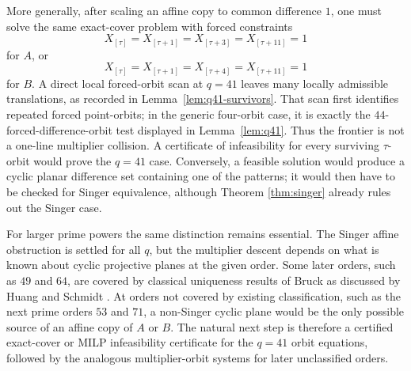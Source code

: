 \documentclass[11pt,letterpaper]{amsart}
\theoremstyle{plain}
\begin{document}
More generally, after scaling an affine copy to common difference \(1\),
one must solve the same exact-cover problem with forced constraints
\[
 X_{[\tau]}=X_{[\tau+1]}=X_{[\tau+3]}=X_{[\tau+11]}=1
\]
for \(A\), or
\[
 X_{[\tau]}=X_{[\tau+1]}=X_{[\tau+4]}=X_{[\tau+11]}=1
\]
for \(B\).  A direct local forced-orbit scan at \(q=41\) leaves many
locally admissible translations, as recorded in
Lemma~\ref{lem:q41-survivors}.
That scan first identifies repeated forced point-orbits; in the generic
four-orbit case, it is exactly the \(44\)-forced-difference-orbit test
displayed in Lemma~\ref{lem:q41}.
Thus the frontier is not a one-line multiplier collision.  A certificate
of infeasibility for every surviving \(\tau\)-orbit would prove the
\(q=41\) case.  Conversely, a feasible solution would produce a cyclic
planar difference set containing one of the patterns; it would then have
to be checked for Singer equivalence, although Theorem \ref{thm:singer}
already rules out the Singer case.

For larger prime powers the same distinction remains essential.  The
Singer affine obstruction is settled for all \(q\), but the multiplier
descent depends on what is known about cyclic projective planes at the
given order.  Some later orders, such as \(49\) and \(64\), are covered
by classical uniqueness results of Bruck as discussed by Huang and
Schmidt \cite{Bruck,HuangSchmidt}.  At orders not covered by existing
classification, such as the next prime orders \(53\) and \(71\), a
non-Singer cyclic plane would be the only possible source of an affine
copy of \(A\) or \(B\).  The natural next step is therefore a certified
exact-cover or MILP
infeasibility certificate for the \(q=41\) orbit equations, followed by
the analogous multiplier-orbit systems for later unclassified orders.
\end{document}
